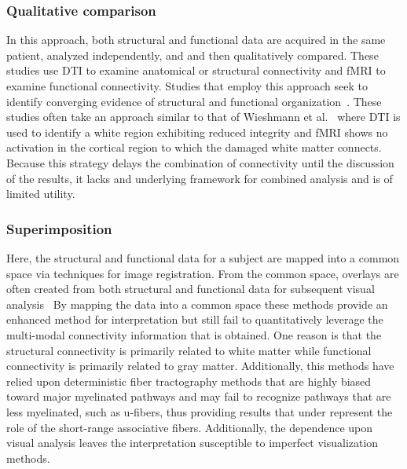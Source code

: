 \subsubsection{Qualitative comparison}
In this approach, both structural and functional data are acquired in the same patient, analyzed independently, and and then qualitatively compared. These studies use DTI to examine anatomical or structural connectivity and fMRI to examine functional connectivity. Studies that employ this approach seek to identify converging evidence of structural and functional organization~\cite{Jang2005,Klein2007,Munakata2006,Shinoura2006,Werring1998}. These studies often take an approach similar to that of Wieshmann et al.~\cite{Wieshmann2001} where DTI is used to identify a white region exhibiting reduced integrity and fMRI shows no activation in the cortical region to which the damaged white matter connects. Because this strategy delays the combination of connectivity until the discussion of the results, it lacks and underlying framework for combined analysis and is of limited utility.

\subsubsection{Superimposition}
Here, the structural and functional data for a subject are mapped into a common space via techniques for image registration. From the common space, overlays are often created from both structural and functional data for subsequent visual analysis~\cite{Behrens2006,Berman2004,Hendler2003,Krings2001,Moeller-Hartmann2002,Okumura2005,Parmar2004,Reinges2004,Seghier2004}
By mapping the data into a common space these methods provide an enhanced method for interpretation but still fail to quantitatively leverage the multi-modal connectivity information that is obtained. One reason is that the structural connectivity is primarily related to white matter while functional connectivity is primarily related to gray matter. Additionally, this methods have relied upon deterministic fiber tractography methods that are highly biased toward major myelinated pathways and may fail to recognize pathways that are less myelinated, such as u-fibers, thus providing results that under represent the role of the short-range associative fibers. Additionally, the dependence upon visual analysis leaves the interpretation susceptible to imperfect visualization methods.

